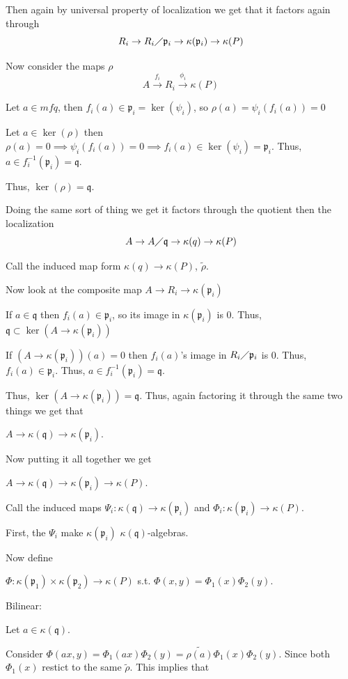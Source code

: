 \documentclass[12pt, letterpaper]{article}
\newcommand{\p}{\mathfrak{p}}
\newcommand{\mf}[1]{\mathfrak{#1}}
\begin{document}
\begin{problemproof}
    Then again by universal property of localization we get that it factors again through
    \[R_i \to R_i \diagup \p_i \to \kappa(\p_i) \to \kappa(P)\]

    Now consider the maps $\rho$
    \[A \overset{f_i}{\to} R_i \overset{\phi_i}{\to} \kappa(P)\]

    Let $a \in mf{q}$, then $f_i(a) \in \p_i = \ker(\psi_i)$, so $\rho(a)=\psi_i(f_i(a))=0$

    Let $a \in \ker(\rho)$ then $\rho(a)=0 \implies \psi_i(f_i(a))=0 \implies f_i(a) \in \ker(\psi_i)=\p_i$. Thus, $a \in f^{-1}_i(\p_i)=\mf{q}$.

    Thus, $\ker(\rho)=\mf{q}$.

    Doing the same sort of thing we get it factors through the quotient then the localization
    \[A \to A \diagup \mf{q} \to \kappa(q) \to \kappa(P)\]

    Call the induced map form $\kappa(q) \to \kappa(P)$, $\tilde{\rho}$.

    Now look at the composite map $A \to R_i \to \kappa(\p_i)$
    
    If $a \in \mf{q}$ then $f_i(a) \in \p_i$, so its image in $\kappa(\p_i)$ is 0. Thus, $\mf{q} \subset \ker(A \to \kappa(\p_i))$

    If $(A \to \kappa(\p_i))(a)=0$ then $f_i(a)$'s image in $R_i \diagup \p_i$ is 0. Thus, $f_i(a) \in \p_i$. Thus, $a \in f^{-1}_i(\p_i) = \mf{q}$.

    Thus, $\ker(A \to \kappa(\p_i)) = \mf{q}$. Thus, again factoring it through the same two things we get that

    $A \to \kappa(\mf{q}) \to \kappa(\p_i)$.

    Now putting it all together we get

    $A \to \kappa(\mf{q}) \to \kappa(\p_i) \to \kappa(P)$.

    Call the induced maps $\Psi_i :\kappa(\mf{q}) \to \kappa(\p_i)$ and $\Phi_i : \kappa(\p_i) \to \kappa(P)$.

    First, the $\Psi_i$ make $\kappa(\p_i)$ $\kappa(\mf{q})$-algebras.

    Now define

    $\Phi : \kappa(\p_1) \times \kappa(\p_2) \to \kappa(P)$ s.t. $\Phi(x,y)=\Phi_1(x)\Phi_2(y)$.

    Bilinear:

    Let $a \in \kappa(\mf{q})$.

    Consider $\Phi(ax,y)=\Phi_1(ax)\Phi_2(y)=\tilde{\rho(a)}\Phi_1(x)\Phi_2(y)$. Since both $\Phi_1(x)$ restict to the same $\tilde{\rho}$. This implies that


\end{problemproof}
\end{document}
